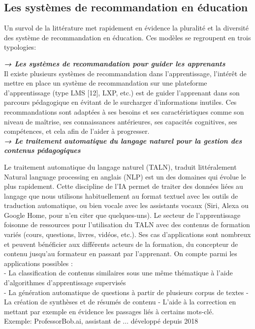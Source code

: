 \subsection{Les systèmes de recommandation en éducation}
 
	Un survol de la littérature met rapidement en évidence la pluralité et la diversité des système de recommandation en éducation. Ces modèles se regroupent en trois typologies: 
	
  	\textbf{\textit{→ Les systèmes de recommandation pour guider les apprenants }} \\
	Il existe plusieurs systèmes de recommandation dans l’apprentissage, l’intérêt de mettre en place un système de recommandation  sur une plateforme d’apprentissage  (type LMS [12], LXP, etc.) est de guider l’apprenant dans son parcours pédagogique en évitant de le surcharger d’informations inutiles. Ces recommandations sont adaptées à ses besoins et ses caractéristiques comme son niveau de maîtrise, ses connaissances antérieures, ses capacités cognitives, ses compétences, et cela afin de l’aider à progresser. \\
	
	
	  \textbf{\textit{→ Le traitement automatique du langage naturel pour la gestion des contenus pédagogiques}} 

\noindent

	Le traitement automatique du langage naturel (TALN), traduit littéralement Natural language processing en anglais (NLP) est un des domaines qui évolue le plus rapidement. Cette discipline de l’IA permet de traiter des données liées au langage que nous utilisons habituellement au format textuel avec les outils de traduction automatique, ou bien vocale avec les assistants vocaux (Siri, Alexa ou Google Home, pour n’en citer que quelques-uns). Le secteur de l’apprentissage foisonne de ressources pour l’utilisation du TALN avec des contenus de formation variés (cours, questions, livres, vidéos, etc.). Ses cas d’applications sont nombreux et peuvent bénéficier aux différents acteurs de la formation, du concepteur de contenu jusqu’au formateur en passant par l’apprenant. On compte parmi les applications possibles : \\
	- La classification de contenus similaires sous une même thématique à l’aide d’algorithmes d’apprentissage supervisés \\
	- La génération automatique de questions à partir de plusieurs corpus de textes
	- La création de synthèses et de résumés de contenu
	- L’aide à la correction en mettant par exemple en évidence les passages liés à certains mots-clé. \\
	Exemple: ProfessorBob.ai, assistant de ... développé depuis 2018
	
